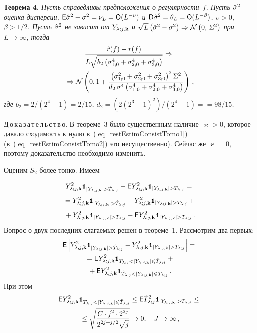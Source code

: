 \begin{multicols}{2}
\noindent
\textbf{Теорема 4.} 
\textit{Пусть справедливы предположения о регулярности~$f$. 
Пусть $\hat\sigma^2$~--- оценка дисперсии, 
${\sf E}\hat\sigma^2-\sigma^2=\nu_L=\textsf{O}(L^{-\upsilon})$ и 
${\sf D}\hat\sigma^2=\theta_L=\textsf{O}(L^{-\beta})$, $\upsilon>0$, $\beta>1/2$. 
Пусть $\hat\sigma^2$ не зависит от $Y_{\lambda;j,\mathbf{k}}$ и $\sqrt{L}\left( \hat\sigma^2 - \sigma^2 \right) 
\Rightarrow \mathcal{N}\left(0,\,\Sigma^2\right)$ при $L\rightarrow\infty$, тогда
\begin{multline*}
\displaystyle\frac{\displaystyle \hat r(f)-r(f)\mathstrut}{\displaystyle  L \sqrt{ b_2 \left( \sigma_{1;0}^4 + \sigma_{2;0}^4 + \sigma_{3;0}^4 \right) } \mathstrut} \Rightarrow{}\\
{}\Rightarrow \mathcal{N}\left( 0, 1+\frac{ \left( \sigma_{1;0}^2 + \sigma_{2;0}^2 + \sigma_{3;0}^2 \right)^2 \Sigma^2 }{ d_2 \,\sigma^4 \left( \sigma_{1;0}^4 + \sigma_{2;0}^4 + \sigma_{3;0}^4 \right) } \right)\,,
\end{multline*}
где $b_2=2/(2^4-1)=2/15$, $d_2 = (2(2^3-1)^2)/(2^4-1)=$\linebreak $=98/15$.}

\medskip

\noindent
Д\,о\,к\,а\,з\,а\,т\,е\,л\,ь\,с\,т\,в\,о.
В теореме~3 было существенным наличие~$\varkappa>0$, которое давало сходимость к нулю 
в~(\ref{eq_restEstimConsistTomo1}) (в~(\ref{eq_restEstimConsistTomo2}) это несущественно). 
Сейчас же $\varkappa=0$, поэтому доказательство необходимо изменить.

Оценим $S_2$ более тонко. Имеем
\vspace*{-9pt}

\noindent
\begin{multline*}
\Yljk^2 \indYjkghTj - \e \Yljk^2 \indYjkgTj = {}\\[3pt]
{}= \Yljk^2 \indYjkghTj - \Yljk^2 \indYjkgTj +{}\\[3pt]
{}+ \Yljk^2 \indYjkgTj - \e \Yljk^2 \indYjkgTj\,.
\vspace*{-3pt}
\end{multline*}
\vspace*{-18pt}

\pagebreak

Вопрос о двух последних слагаемых решен в теореме~1. Рассмотрим два первых:
\begin{multline*}
\e \left| \Yljk^2 \indYjkghTj - \Yljk^2 \indYjkgTj \right| = {}\\
{}=\e \Yljk^2 \Ik_{\Tlj<|\Yljk|\leqslant\hTlj} +{}\\
{}+ \e \Yljk^2 \Ik_{\hTlj<|\Yljk|\leqslant\Tlj}\,.
\end{multline*}
При этом
\begin{multline*}
\e \Yljk^2 \Ik_{\Tlj<|\Yljk|\leqslant\hTlj} \leq \e \hTlj^2 \indYjkgTj \leq{}\\
{}\leq \sqrt{\fr{C\cdot j^2\cdot 2^{2j}}{2^{2j+j/2}\sqrt{j}}}\rightarrow 0,\quad J\rightarrow\infty\,,
\end{multline*}


\end{multicols}
